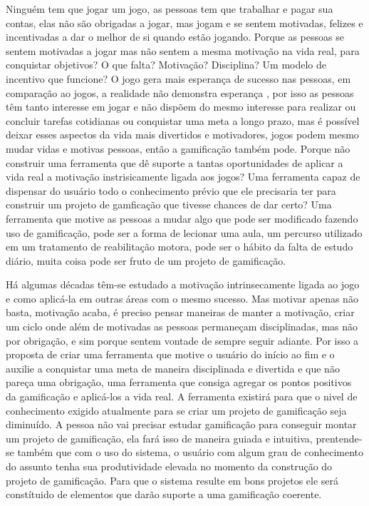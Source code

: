 Ninguém tem que jogar um jogo, as pessoas tem que trabalhar e pagar sua contas, elas não são obrigadas a jogar, mas jogam \cite{chou2015actionable} e se sentem motivadas, felizes e incentivadas a dar o melhor de si quando estão jogando. Porque as pessoas se sentem motivadas a jogar mas não sentem a mesma motivação na vida real, para conquistar objetivos? O que falta? Motivação? Disciplina? Um modelo de incentivo que funcione? O jogo gera mais esperança de sucesso nas pessoas, em comparação ao jogos, a realidade não demonstra esperança \cite{mcgonigal2011reality}, por isso as pessoas têm tanto interesse em jogar e não dispõem do mesmo interesse para realizar ou concluir tarefas cotidianas ou conquistar uma meta a longo prazo, mas é possível deixar esses aspectos da vida mais divertidos e motivadores, jogos podem mesmo mudar vidas e motivas pessoas, então a gamificação também pode. Porque não construir uma ferramenta que dê suporte a tantas oportunidades de aplicar a vida real a motivação instrisicamente ligada aos jogos? Uma ferramenta capaz de dispensar do usuário todo o conhecimento prévio que ele precisaria ter para construir um projeto de gamficação que tivesse chances de dar certo? Uma ferramenta que motive as pessoas a mudar algo que pode ser modificado fazendo uso de gamificação, pode ser a forma de lecionar uma aula, um percurso utilizado em um tratamento de reabilitação motora, pode ser o hábito da falta de estudo diário, muita coisa pode ser fruto de um projeto de gamificação.

Há algumas décadas têm-se estudado a motivação intrinsecamente ligada ao jogo e como aplicá-la em outras áreas com o mesmo sucesso. Mas motivar apenas não basta, motivação acaba, é preciso pensar maneiras de manter a motivação, criar um ciclo onde além de motivadas as pessoas permaneçam disciplinadas, mas não por obrigação, e sim porque sentem vontade de sempre seguir adiante. Por isso a proposta de criar uma ferramenta que motive o usuário do início ao fim e o auxilie a  conquistar uma meta de maneira disciplinada e divertida e que não pareça uma obrigação, uma ferramenta que consiga agregar os pontos positivos da gamificação e aplicá-los a vida real. A ferramenta existirá para que o nivel de conhecimento exigido atualmente para se criar um projeto de gamificação seja diminuído. A pessoa não vai precisar estudar gamificação para conseguir montar um projeto de gamificação, ela fará isso de maneira guiada e intuitiva, prentende-se também que com o uso do sistema, o usuário com algum grau de conhecimento do assunto tenha sua produtividade elevada no momento da construção do projeto de gamificação. Para que o sistema resulte em bons projetos ele será constítuido de elementos que darão suporte a uma gamificação coerente.


